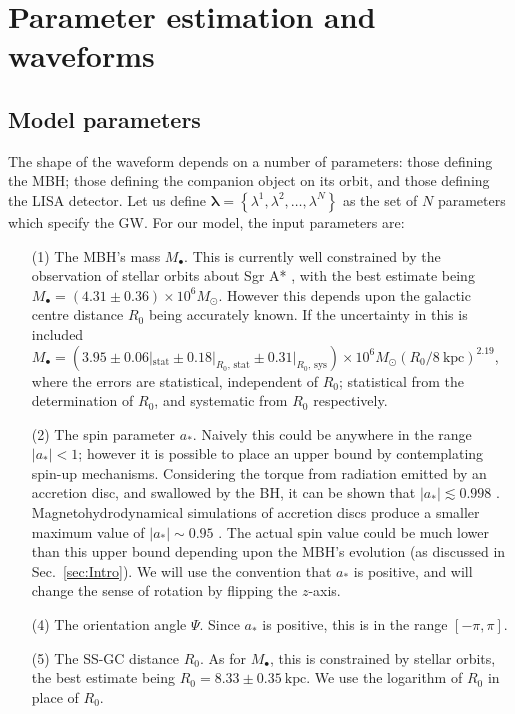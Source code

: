 \documentclass[useAMS,usedcolumn,usegraphicx,usenatbib]{mn2e}
\newcommand{\secref}[1]{Sec.~\ref{sec:#1}}
\newcommand{\units}[1]{\ensuremath{~\mathrm{#1}}}
\newcommand{\sub}[1]{\ensuremath{_\mathrm{#1}}}
\begin{document}
\section{Parameter estimation and waveforms}\label{sec:Parameters}

\subsection{Model parameters}

The shape of the waveform depends on a number of parameters: those defining the MBH; those defining the companion object on its orbit, and those defining the LISA detector. Let us define $\boldsymbol{\lambda} = \left\{\lambda^1, \lambda^2, \ldots, \lambda^N\right\}$ as the set of $N$ parameters which specify the GW. For our model, the input parameters are:
\begin{enumerate}
\item[(1)] The MBH's mass $M_\bullet$. This is currently well constrained by the observation of stellar orbits about Sgr A* \citep{Ghez2008, Gillessen2009}, with the best estimate being $M_\bullet = (4.31 \pm 0.36) \times 10^6 M_\odot$. However this depends upon the galactic centre distance $R_0$ being accurately known. If the uncertainty in this is included $M_\bullet = (3.95 \pm 0.06|\sub{stat} \pm 0.18|_{R_0, \, \mathrm{stat}} \pm  0.31|_{R_0, \, \mathrm{sys}}) \times 10^6 M_\odot (R_0 / 8\units{kpc})^{2.19}$, where the errors are statistical, independent of $R_0$; statistical from the determination of $R_0$, and systematic from $R_0$ respectively.
\item[(2)] The spin parameter $a_\ast$. Naively this could be anywhere in the range $|a_\ast| < 1$; however it is possible to place an upper bound by contemplating spin-up mechanisms. Considering the torque from radiation emitted by an accretion disc, and swallowed by the BH, it can be shown that $|a_\ast| \lesssim 0.998$ \citep{Thorne1974}. Magnetohydrodynamical simulations of accretion discs produce a smaller maximum value of $|a_\ast| \sim 0.95$ \citep{Gammie2004}. The actual spin value could be much lower than this upper bound depending upon the MBH's evolution (as discussed in \secref{Intro}). We will use the convention that $a_\ast$ is positive, and will change the sense of rotation by flipping the $z$-axis.
\item[(4)] The orientation angle $\Psi$. Since $a_\ast$ is positive, this is in the range $[-\pi, \pi]$.
\item[(5)] The SS-GC distance $R_0$. As for $M_\bullet$, this is constrained by stellar orbits, the best estimate being \citep{Gillessen2009} $R_0 = 8.33 \pm 0.35\units{kpc}$. We use the logarithm of $R_0$ in place of $R_0$.

\end{enumerate}
\end{document}
